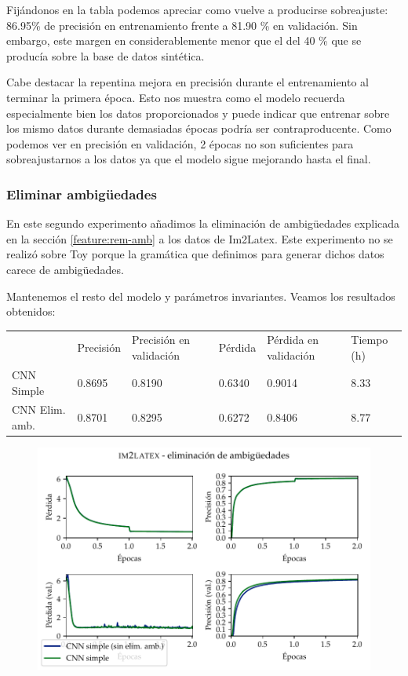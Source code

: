 \documentclass[a4paper, 20pt, dvipsnames]{article}
\begin{document}
Fijándonos en la tabla podemos apreciar como vuelve a producirse sobreajuste:
86.95\% de precisión en entrenamiento frente a 81.90 \% en validación. Sin
embargo, este margen en considerablemente menor que el del 40 \% que se producía
sobre la base de datos sintética.

Cabe destacar la repentina mejora en precisión durante el entrenamiento al
terminar la primera época. Esto nos muestra como el modelo recuerda
especialmente bien los datos proporcionados y puede indicar que entrenar sobre
los mismo datos durante demasiadas épocas podría ser contraproducente. Como
podemos ver en precisión en validación, 2 épocas no son suficientes para
sobreajustarnos a los datos ya que el modelo sigue mejorando hasta el final.

\subsubsection{Eliminar ambigüedades}
\label{exp:2}

En este segundo experimento añadimos la eliminación de ambigüedades explicada en
la sección \ref{feature:rem-amb} a los datos de Im2Latex. Este experimento no se
realizó sobre Toy porque la gramática que definimos para generar dichos datos
carece de ambigüedades.

Mantenemos el resto del modelo y parámetros invariantes. Veamos los resultados obtenidos:

\begin{table}[H]
	\begin{tabular}{llllll}
		\centering
		& Precisión & Precisión en validación & Pérdida & Pérdida en validación & Tiempo (h) \\ \cline{2-6} 
		CNN Simple       & 0.8695    & 0.8190                  & 0.6340  & 0.9014                & 8.33       \\
		CNN Elim. amb. & 0.8701    & 0.8295                  & 0.6272  & 0.8406                & 8.77      
	\end{tabular}
\end{table}

\begin{figure}[H]
	\centering
	\includegraphics{fig/im2latex-2.pdf}
\end{figure}
\end{document}
